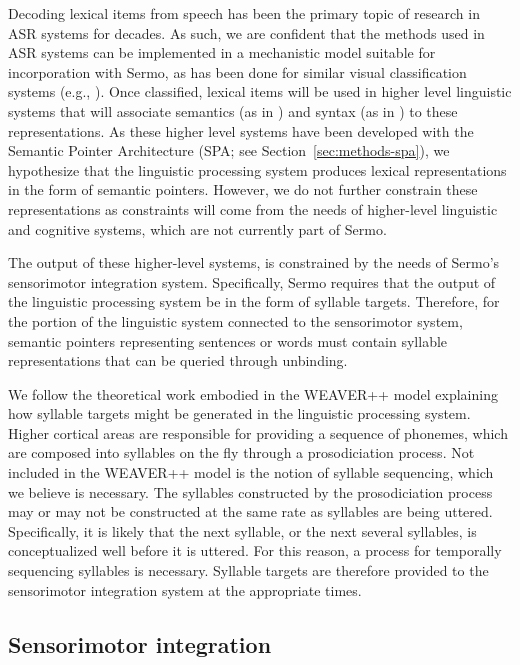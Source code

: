 Decoding lexical items from speech
has been the primary topic of research
in ASR systems for decades.
As such, we are confident that
the methods used in ASR systems
can be implemented in a mechanistic model
suitable for incorporation with Sermo,
as has been done for similar
visual classification systems
(e.g., \citealt{hunsberger2013,hunsberger2015}).
Once classified, lexical items
will be used in higher level linguistic
systems that will associate
semantics (as in \citealt{blouw2013,blouw2015})
and syntax (as in \citealt{stewart2014,stewart2015})
to these representations.
As these higher level systems
have been developed with
the Semantic Pointer Architecture
(SPA; see Section~\ref{sec:methods-spa}),
we hypothesize that the linguistic processing system
produces lexical representations
in the form of semantic pointers.
However, we do not further constrain these representations
as constraints will come from the needs of
higher-level linguistic and cognitive systems,
which are not currently part of Sermo.

The output of these higher-level systems,
is constrained by the needs
of Sermo's sensorimotor integration system.
Specifically, Sermo requires that
the output of the
linguistic processing system
be in the form of syllable targets.
Therefore, for the portion
of the linguistic system connected
to the sensorimotor system,
semantic pointers representing
sentences or words must contain
syllable representations that can be
queried through unbinding.

We follow the theoretical work
embodied in the WEAVER++ model
\citet{roelofs2000,roelofs2008,roelofs2014}
explaining how syllable targets might be generated
in the linguistic processing system.
Higher cortical areas are responsible
for providing a sequence of phonemes,
which are composed into syllables on the fly
through a prosodiciation process.
Not included in the WEAVER++ model
is the notion of syllable sequencing,
which we believe is necessary.
The syllables constructed by the
prosodiciation process
may or may not be constructed
at the same rate as syllables
are being uttered.
Specifically, it is likely that
the next syllable,
or the next several syllables,
is conceptualized well before it is uttered.
For this reason, a process for
temporally sequencing syllables
is necessary.
Syllable targets are therefore provided
to the sensorimotor integration system
at the appropriate times.

\subsection{Sensorimotor integration}
\label{sec:model-sm}

